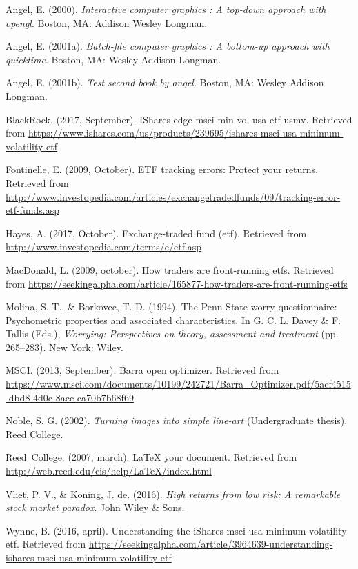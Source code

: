 \documentclass[12pt,twoside]{reedthesis}
\theoremstyle{definition}
\theoremstyle{definition}
\theoremstyle{definition}
\theoremstyle{remark}
\begin{document}
\hypertarget{refs}{}
\hypertarget{ref-angel2000}{}
Angel, E. (2000). \emph{Interactive computer graphics : A top-down
approach with opengl}. Boston, MA: Addison Wesley Longman.

\hypertarget{ref-angel2001}{}
Angel, E. (2001a). \emph{Batch-file computer graphics : A bottom-up
approach with quicktime}. Boston, MA: Wesley Addison Longman.

\hypertarget{ref-angel2002a}{}
Angel, E. (2001b). \emph{Test second book by angel}. Boston, MA: Wesley
Addison Longman.

\hypertarget{ref-blackrock2017}{}
BlackRock. (2017, September). IShares edge msci min vol usa etf
\textbar{} usmv. Retrieved from
\url{https://www.ishares.com/us/products/239695/ishares-msci-usa-minimum-volatility-etf}

\hypertarget{ref-fontinelle2009}{}
Fontinelle, E. (2009, October). ETF tracking errors: Protect your
returns. Retrieved from
\url{http://www.investopedia.com/articles/exchangetradedfunds/09/tracking-error-etf-funds.asp}

\hypertarget{ref-hayes2017}{}
Hayes, A. (2017, October). Exchange-traded fund (etf). Retrieved from
\url{http://www.investopedia.com/terms/e/etf.asp}

\hypertarget{ref-macdonald2009}{}
MacDonald, L. (2009, october). How traders are front-running etfs.
Retrieved from
\url{https://seekingalpha.com/article/165877-how-traders-are-front-running-etfs}

\hypertarget{ref-Molina1994}{}
Molina, S. T., \& Borkovec, T. D. (1994). The Penn State worry
questionnaire: Psychometric properties and associated characteristics.
In G. C. L. Davey \& F. Tallis (Eds.), \emph{Worrying: Perspectives on
theory, assessment and treatment} (pp. 265--283). New York: Wiley.

\hypertarget{ref-msci2013}{}
MSCI. (2013, September). Barra open optimizer. Retrieved from
\url{https://www.msci.com/documents/10199/242721/Barra_Optimizer.pdf/5acf4515-dbd8-4d0c-8acc-ca70b7b68f69}

\hypertarget{ref-noble2002}{}
Noble, S. G. (2002). \emph{Turning images into simple line-art}
(Undergraduate thesis). Reed College.

\hypertarget{ref-reedweb2007}{}
Reed~College. (2007, march). LaTeX your document. Retrieved from
\url{http://web.reed.edu/cis/help/LaTeX/index.html}

\hypertarget{ref-van2016}{}
Vliet, P. V., \& Koning, J. de. (2016). \emph{High returns from low
risk: A remarkable stock market paradox}. John Wiley \& Sons.

\hypertarget{ref-wynne2016}{}
Wynne, B. (2016, april). Understanding the iShares msci usa minimum
volatility etf. Retrieved from
\url{https://seekingalpha.com/article/3964639-understanding-ishares-msci-usa-minimum-volatility-etf}


\end{document}

